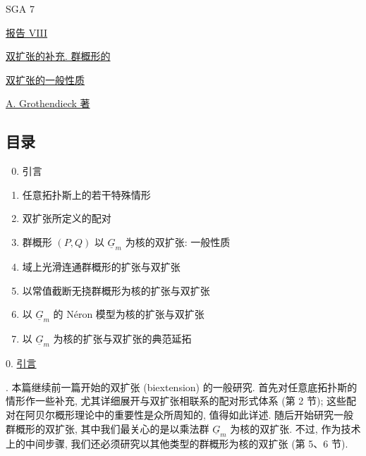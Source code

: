 
\begin{center}
SGA 7

\vspace{1em}
\underline{报告 VIII}

\vspace{1em}
\underline{双扩张的补充. 群概形的}

\underline{双扩张的一般性质}

\vspace{1em}
\underline{A. Grothendieck 著}
\end{center}

\subsection*{目录}

\begin{enumerate}[label=\arabic*.]
\setcounter{enumi}{-1}
\item 引言
\item 任意拓扑斯上的若干特殊情形
\item 双扩张所定义的配对
\item 群概形 $(P,Q)$ 以 $\underline G_m$ 为核的双扩张: 一般性质
\item 域上光滑连通群概形的扩张与双扩张
\item 以常值截断无挠群概形为核的扩张与双扩张
\item 以 $\underline G_m$ 的 N\'eron 模型为核的扩张与双扩张
\item 以 $\underline G_m$ 为核的扩张与双扩张的典范延拓
\end{enumerate}

0. \underline{引言}

. 本篇继续前一篇开始的双扩张 (biextension) 的一般研究. 首先对任意底拓扑斯的情形作一些补充, 尤其详细展开与双扩张相联系的配对形式体系 (第 2 节); 这些配对在阿贝尔概形理论中的重要性是众所周知的, 值得如此详述. 随后开始研究一般群概形的双扩张, 其中我们最关心的是以乘法群 $\underline G_m$ 为核的双扩张. 不过, 作为技术上的中间步骤, 我们还必须研究以其他类型的群概形为核的双扩张 (第 5、6 节).

